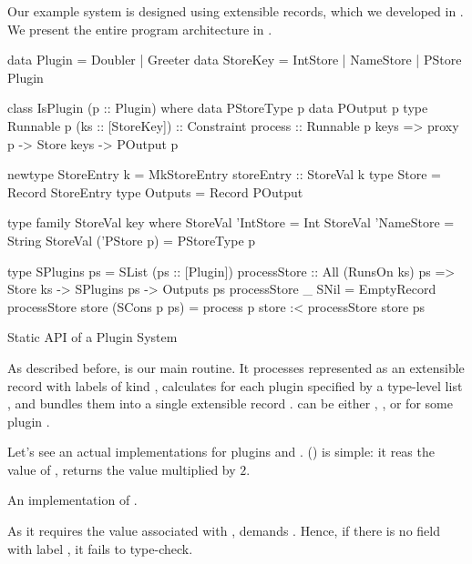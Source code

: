 \documentclass[demotion-paper.tex]{subfiles}
\begin{document}
Our example system is designed using extensible records, which we developed in .
We present the entire program architecture in .
\begin{listing}[tbp]
\begin{code}
data Plugin = Doubler | Greeter
data StoreKey = IntStore | NameStore
              | PStore Plugin

class IsPlugin (p :: Plugin) where
  data PStoreType p
  data POutput p
  type Runnable p (ks :: [StoreKey]) :: Constraint
  process :: Runnable p keys
    => proxy p -> Store keys -> POutput p

newtype StoreEntry k =
  MkStoreEntry {storeEntry :: StoreVal k}
type Store = Record StoreEntry
type Outputs = Record POutput

type family StoreVal key where
  StoreVal 'IntStore = Int
  StoreVal 'NameStore = String
  StoreVal ('PStore p) = PStoreType p

type SPlugins ps = SList (ps :: [Plugin])
processStore :: All (RunsOn ks) ps
  => Store ks -> SPlugins ps -> Outputs ps
processStore _ SNil = EmptyRecord
processStore store (SCons p ps) = 
  process p store :< processStore store ps
\end{code}
\caption{Static API of a Plugin System}
\label{lst:plugin-arch}
\end{listing}
As described before,  is our main routine.
It processes  represented as an extensible record with labels of kind , calculates  for each plugin specified by a type-level list , and bundles them into a single extensible record .
 can be either , , or  for some plugin .

Let's see an actual implementations for plugins  and .
 () is simple: it reas the value of , returns the value multiplied by $2$.
\begin{listing}[tbp]
\caption{An implementation of .}
\label{lst:plugin-double}
\end{listing}
As it requires the value associated with ,  demands .
Hence, if there is no field with label , it fails to type-check.
\end{document}
